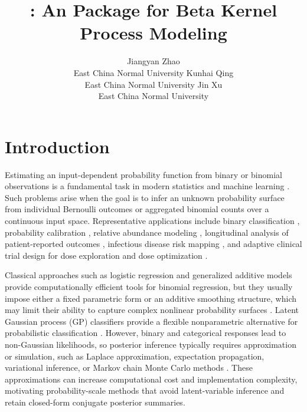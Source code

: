 \documentclass[article, shortnames]{jss}
\author{Jiangyan Zhao\\East China Normal University
   \And Kunhai Qing\\East China Normal University
   \AND Jin Xu\\East China Normal University}
\title{\pkg{BKP}: An \proglang{R} Package for Beta Kernel Process Modeling}
\begin{document}
\newpage

\section{Introduction } \label{sec:intro}

Estimating an input-dependent probability function from binary or binomial observations is a fundamental task in modern statistics and machine learning \citep{Hastie2009StatLearning, Rolland2019BKP, Murphy2022PML}. Such problems arise when the goal is to infer an unknown probability surface from individual Bernoulli outcomes or aggregated binomial counts over a continuous input space. Representative applications include binary classification \citep{MacKenzie2014, Wen2025KLR}, probability calibration \citep{Sung2020binaryCalibration, Dimitriadis2023}, relative abundance modeling \citep{Martin2020}, longitudinal analysis of patient-reported outcomes \citep{Najera2018HRQoL, Najera2019PRO}, infectious disease risk mapping \citep{Diggle2007Loa, Diggle2016Prevalence}, and adaptive clinical trial design for dose exploration and dose optimization \citep{Benest2022CoBe, Zhao2026SKBD}.

Classical approaches such as logistic regression and generalized additive models provide computationally efficient tools for binomial regression, but they usually impose either a fixed parametric form or an additive smoothing structure, which may limit their ability to capture complex nonlinear probability surfaces \citep{Hastie2009StatLearning}. Latent Gaussian process (GP) classifiers provide a flexible nonparametric alternative for probabilistic classification \citep{Rasmussen2006GPML}. However, binary and categorical responses lead to non-Gaussian likelihoods, so posterior inference typically requires approximation or simulation, such as Laplace approximation, expectation propagation, variational inference, or Markov chain Monte Carlo methods \citep{Nickisch2008BinaryGP}. These approximations can increase computational cost and implementation complexity, motivating probability-scale methods that avoid latent-variable inference and retain closed-form conjugate posterior summaries.
\end{document}
